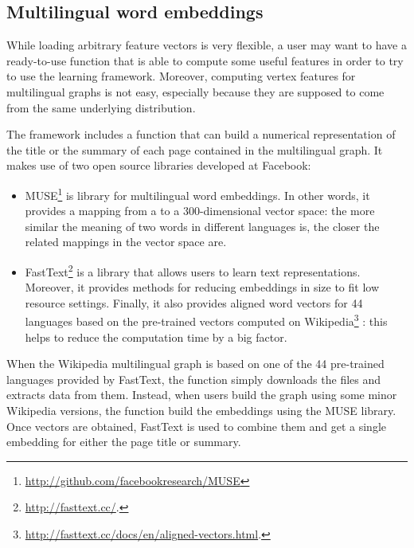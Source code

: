         \subsection{Multilingual word embeddings}
            While loading arbitrary feature vectors is very flexible, a user may want to have a ready-to-use function that is able to compute some useful features in order to try to use the learning framework. Moreover, computing vertex features for multilingual graphs is not easy, especially because they are supposed to come from the same underlying distribution.
            
            The framework includes a function that can build a numerical representation of the title or the summary of each page contained in the multilingual graph. It makes use of two open source libraries developed at Facebook:
            \begin{itemize}
                \item MUSE\footnote{\url{http://github.com/facebookresearch/MUSE}} \cite{Conneau}\cite{Lample} is library for multilingual word embeddings. In other words, it provides a mapping from a  to a \(300\)-dimensional vector space: the more similar the meaning of two words in different languages is, the closer the related mappings in the vector space are.
                \item FastText\footnote{\url{http://fasttext.cc/}.} is a library that allows users to learn text representations. Moreover, it provides methods for reducing embeddings in size to fit low resource settings. Finally, it also provides aligned word vectors for 44 languages based on the pre-trained vectors computed on Wikipedia\footnote{\url{http://fasttext.cc/docs/en/aligned-vectors.html}.} \cite{Joulin}\cite{Bojanowski}: this helps to reduce the computation time by a big factor.
            \end{itemize}
            
            When the Wikipedia multilingual graph is based on one of the 44 pre-trained languages provided by FastText, the function simply downloads the files and extracts data from them. Instead, when users build the graph using some minor Wikipedia versions, the function build the embeddings using the MUSE library. Once vectors are obtained, FastText is used to combine them and get a single embedding for either the page title or summary.
            
